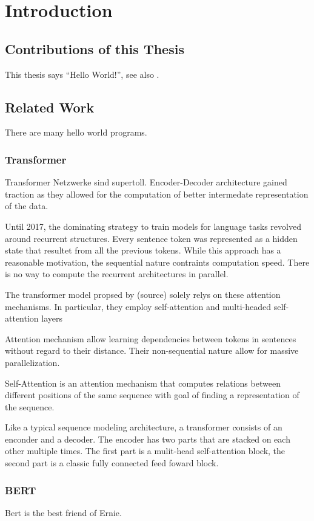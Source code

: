 \documentclass[english, version-2022-01]{uzl-thesis}
\begin{document}
\chapter{Introduction}
\section{Contributions of this Thesis}
This thesis says ``Hello World!'', see also \cite{Kernighan1974}.
\section{Related Work}
There are many hello world programs.

\subsection{Transformer}
Transformer Netzwerke sind supertoll. Encoder-Decoder architecture gained traction as they allowed for the computation of better intermedate representation of the data.

Until 2017, the dominating strategy to train models for language tasks revolved around recurrent structures. Every sentence token was represented as a hidden state that resultet from all the previous tokens. While this approach has a reasonable motivation, the sequential nature contraints computation speed. There is no way to compute the recurrent architectures in parallel. 

The transformer model propsed by (source) solely relys on these attention mechanisms. In particular, they employ self-attention and multi-headed self-attention layers

Attention mechanism allow learning dependencies between tokens in sentences without regard to their distance. Their non-sequential nature allow for massive parallelization.

Self-Attention is an attention mechanism that computes relations between different positions of the same sequence with goal of finding a representation of the sequence.

Like a typical sequence modeling architecture, a transformer consists of an enconder and a decoder. The encoder has two parts that are stacked on each other multiple times. The first part is a mulit-head self-attention block, the second part is a classic fully connected feed foward block. 


\subsection{BERT}
Bert is the best friend of Ernie.
\end{document}
